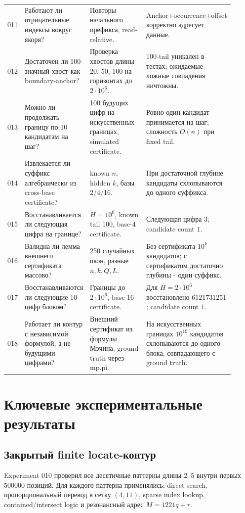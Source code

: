 \documentclass[11pt,a4paper]{article}
\begin{document}
\begin{longtable}{p{0.06\linewidth}p{0.27\linewidth}p{0.29\linewidth}p{0.29\linewidth}}
011 & Работают ли отрицательные индексы вокруг якоря? & Повторы начального префикса, read-relative. & Anchor+occurrence+offset корректно адресует данные. \\
012 & Достаточен ли 100-значный хвост как boundary-anchor? & Проверка хвостов длины 20, 50, 100 на горизонтах до $2\cdot10^6$. & 100-tail уникален в тестах; ожидаемые ложные совпадения ничтожны. \\
013 & Можно ли продолжать границу по 10 кандидатам на шаг? & 100 будущих цифр на искусственных границах, simulated certificate. & Ровно один кандидат принимается на шаг; сложность $O(n)$ при fixed tail. \\
014 & Извлекается ли суффикс алгебраически из cross-base certificate? & known $n$, hidden $k$, базы 2/4/16. & При достаточной глубине кандидаты схлопываются до одного суффикса. \\
015 & Восстанавливается ли следующая цифра на границе? & $H=10^6$, known tail 100, base-4 certificate. & Следующая цифра $3$; candidate count $1$. \\
016 & Валидна ли лемма внешнего сертификата массово? & 250 случайных окон, разные $n,k,Q,L$. & Без сертификата $10^k$ кандидатов; с сертификатом достаточно глубины - один суффикс. \\
017 & Восстанавливаются ли следующие 10 цифр блоком? & Границы до $2\cdot10^6$, base-16 certificate. & Для $H=2\cdot10^6$ восстановлено $6121731251$; candidate count $1$. \\
018 & Работает ли контур с независимой формулой, а не будущими цифрами? & Внешний сертификат из формулы Мэчина, ground truth через mp.pi. & На искусственных границах $10^{10}$ кандидатов схлопываются до одного блока, совпадающего с ground truth. \\
\bottomrule
\end{longtable}
\normalsize

\section{Ключевые экспериментальные результаты}

\subsection{Закрытый finite locate-контур}

Experiment 010 проверил все десятичные паттерны длины $2$--$5$ внутри первых $500000$ позиций.  Для каждого паттерна применялись: direct search, пропорциональный перевод в сетку $(4,11)$, sparse index lookup, contained/intersect logic и резонансный адрес $M=1221q+r$.
\end{document}
